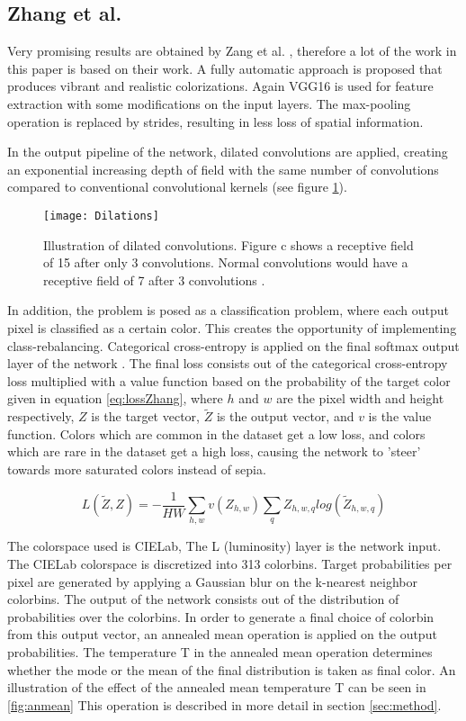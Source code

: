 \subsection{Zhang et al.}
Very promising results are obtained by Zang et al. \cite{Zhang}, therefore a lot of the work in this paper is based on their work.
A fully automatic approach is proposed that produces vibrant and realistic colorizations. Again VGG16 is used for feature extraction with some modifications on the input layers. The max-pooling operation is replaced by strides, resulting in less loss of spatial information. 

In the output pipeline of the network, dilated convolutions \cite{yu2015multi} are applied, creating an exponential increasing depth of field with the same number of convolutions compared to conventional convolutional kernels (see figure \ref{fig:dilations}).

\begin{figure}[h]
	\centering
	\texttt{[image: Dilations]}
	\caption{Illustration of dilated convolutions. Figure c shows a receptive field of 15 after only 3 convolutions. Normal convolutions would have a receptive field of 7 after 3 convolutions \cite{yu2015multi}.}
	\label{fig:dilations}
\end{figure}

In addition, the problem is posed as a classification problem, where each output pixel is classified as a certain color. This creates the opportunity of implementing class-rebalancing.
Categorical cross-entropy is applied on the final softmax output layer of the network \cite{de2005tutorial}. The final loss consists out of the categorical cross-entropy loss multiplied with a value function based on the probability of the target color given in equation \ref{eq:lossZhang}, where $h$ and $w$ are the pixel width and height respectively, $Z$ is the target vector, $\widetilde{Z}$ is the output vector, and $v$ is the value function.
Colors which are common in the dataset get a low loss, and colors which are rare in the dataset get a high loss, causing the network to 'steer' towards more saturated colors instead of sepia. 

\begin{equation}
L(\widetilde{Z},Z)=-\frac{1}{HW}\sum_{h,w}v(Z_{h,w})\sum_q^{}{Z_{h,w,q}log({\widetilde{Z}_{h,w,q}})}
\label{eq:lossZhang}
\end{equation}

The colorspace used is CIELab, The L (luminosity) layer is the network input. The CIELab colorspace is discretized into 313 colorbins. Target probabilities per pixel are generated by applying a Gaussian blur on the k-nearest neighbor colorbins. The output of the network consists out of the distribution of probabilities over the colorbins. In order to generate a final choice of colorbin from this output vector, an annealed mean operation is applied on the output probabilities. The temperature T in the annealed mean operation determines whether the mode or the mean of the final distribution is taken as final color. An illustration of the effect of the annealed mean temperature T can be seen in \ref{fig:anmean} This operation is described in more detail in section \ref{sec:method}.


